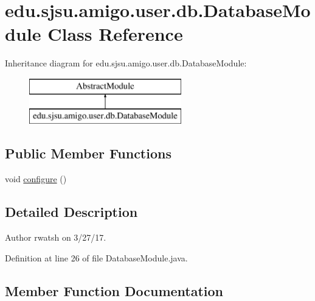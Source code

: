 \hypertarget{classedu_1_1sjsu_1_1amigo_1_1user_1_1db_1_1_database_module}{}\section{edu.\+sjsu.\+amigo.\+user.\+db.\+Database\+Module Class Reference}
\label{classedu_1_1sjsu_1_1amigo_1_1user_1_1db_1_1_database_module}
Inheritance diagram for edu.\+sjsu.\+amigo.\+user.\+db.\+Database\+Module\+:\begin{figure}[H]
\begin{center}
\leavevmode
\includegraphics[height=2.000000cm]{classedu_1_1sjsu_1_1amigo_1_1user_1_1db_1_1_database_module}
\end{center}
\end{figure}
\subsection*{Public Member Functions}
\begin{DoxyCompactItemize}
\item 
void \hyperlink{classedu_1_1sjsu_1_1amigo_1_1user_1_1db_1_1_database_module_a181698f9abe3f313bed333719cc99a8d}{configure} ()
\end{DoxyCompactItemize}


\subsection{Detailed Description}
\begin{DoxyAuthor}{Author}
rwatsh on 3/27/17. 
\end{DoxyAuthor}


Definition at line 26 of file Database\+Module.\+java.



\subsection{Member Function Documentation}
\mbox{\label{classedu_1_1sjsu_1_1amigo_1_1user_1_1db_1_1_database_module_a181698f9abe3f313bed333719cc99a8d}} 
